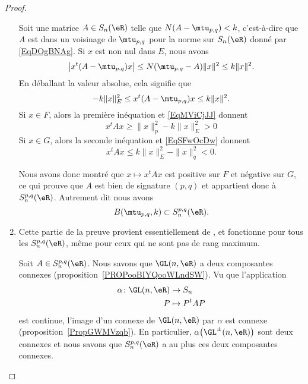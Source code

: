 \begin{proof}
\begin{enumerate}
            Soit une matrice \( A\in S_n(\eR)\) telle que \( N(A-\mtu_{p,q})<k\), c'est-à-dire que \( A\) est dans un voisinage de \( \mtu_{p,q}\) pour la norme sur \( S_n(\eR)\) donné par \eqref{EqDOgBNAg}. Si \( x\) est non nul dans \( E\), nous avons
            \begin{equation}
                \big| x^t(A-\mtu_{p,q})x \big|\leq N(\mtu_{p,q}-A)\| x \|^2\leq k\| x \|^2.
            \end{equation}
            En déballant la valeur absolue, cela signifie que
            \begin{equation}
                -k\| x \|_E^2\leq x^t(A-\mtu_{p,q})x\leq k\| x \|^2.
            \end{equation}
            Si \( x\in F\), alors la première inéquation et \eqref{EqMViCjJJ} donnent
            \begin{equation}
                x^tAx\geq \| x \|_p^2-k\| x \|_E^2>0
            \end{equation}
            Si \( x\in G\), alors la seconde inéquation et \eqref{EqSFwOcDw} donnent
            \begin{equation}
                x^tAx\leq  k\| x \|_E^2-\| x \|_q^2<0.
            \end{equation}

            Nous avons donc montré que \( x\mapsto x^tAx\) est positive sur \( F\) et négative sur \( G\), ce qui prouve que \( A\) est bien de signature \( (p,q)\) et appartient donc à \( S_n^{p,q}(\eR)\). Autrement dit nous avons
            \begin{equation}
                B(\mtu_{p,q},k)\subset S_n^{p,q}(\eR).
            \end{equation}

        \item
            Cette partie de la preuve provient essentiellement de \cite{VKqpMYL}, et fonctionne pour tous les \( S_n^{p,q}(\eR)\), même pour ceux qui ne sont pas de rang maximum.

            Soit \( A\in S_n^{p,q}(\eR)\). Nous savons que \( \GL(n,\eR)\) a deux composantes connexes (proposition~\ref{PROPooBIYQooWLndSW}). Vu que l'application
            \begin{equation}
                \begin{aligned}
                    \alpha\colon \GL(n,\eR)&\to S_n \\
                    P&\mapsto P^tAP
                \end{aligned}
            \end{equation}
            est continue, l'image d'un connexe de \( \GL(n,\eR)\) par \( \alpha\) est connexe (proposition~\ref{PropGWMVzqb}). En particulier, \( \alpha\big( \GL^{\pm}(n,\eR) \big)\) sont deux connexes et nous savons que \( S_n^{p,q}(\eR)\) a au plus ces deux composantes connexes.


\end{enumerate}
\end{proof}
